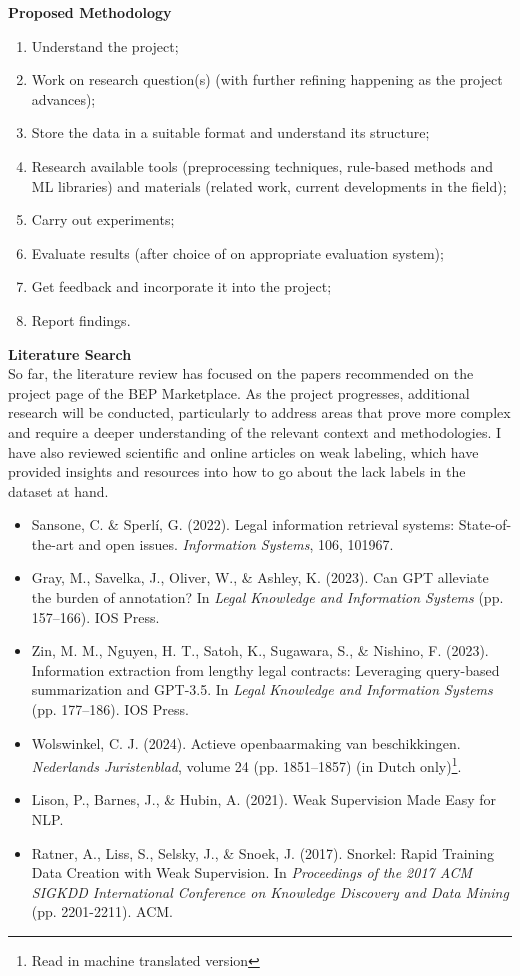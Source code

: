 \documentclass[11pt]{article}
\begin{document}
\textbf{Proposed Methodology}
\setlength{\itemsep}{0pt} %
\begin{enumerate}
    \item Understand the project;
    \item Work on research question(s) (with further refining happening as the project advances);
    \item Store the data in a suitable format and understand its structure;
    \item Research available tools (preprocessing techniques, rule-based methods and ML libraries) and materials (related work, current developments in the field);
    \item Carry out experiments;
    \item Evaluate results (after choice of on appropriate evaluation system);
    \item Get feedback and incorporate it into the project;
    \item Report findings.
\end{enumerate}

\textbf{Literature Search}\\
So far, the literature review has focused on the papers recommended on the project page of the BEP Marketplace. As the project progresses, additional research will be conducted, particularly to address areas that prove more complex and require a deeper understanding of the relevant context and methodologies. I have also reviewed scientific and online articles on weak labeling, which have provided insights and resources into how to go about the lack labels in the dataset at hand.

\begin{itemize}
    \item Sansone, C. \& Sperlí, G. (2022). Legal information retrieval systems: State-of-the-art and open issues. \textit{Information Systems}, 106, 101967.
    \item Gray, M., Savelka, J., Oliver, W., \& Ashley, K. (2023). Can GPT alleviate the burden of annotation? In \textit{Legal Knowledge and Information Systems} (pp. 157–166). IOS Press.
    \item Zin, M. M., Nguyen, H. T., Satoh, K., Sugawara, S., \& Nishino, F. (2023). Information extraction from lengthy legal contracts: Leveraging query-based summarization and GPT-3.5. In \textit{Legal Knowledge and Information Systems} (pp. 177–186). IOS Press.
    \item Wolswinkel, C. J. (2024). Actieve openbaarmaking van beschikkingen. \textit{Nederlands Juristenblad}, volume 24 (pp. 1851–1857) (in Dutch only)\footnote{Read in machine translated version}.
    \item Lison, P., Barnes, J., \& Hubin, A. (2021). Weak Supervision Made Easy for NLP. 
    \item Ratner, A., Liss, S., Selsky, J., \& Snoek, J. (2017). Snorkel: Rapid Training Data Creation with Weak Supervision. In \textit{Proceedings of the 2017 ACM SIGKDD International Conference on Knowledge Discovery and Data Mining} (pp. 2201-2211). ACM.
\end{itemize}
\end{document}
